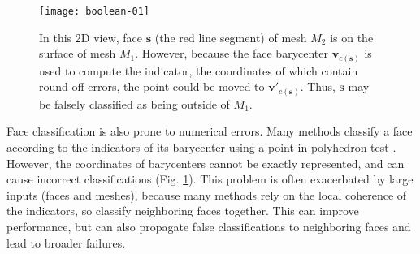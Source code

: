 
\begin{figure}[t]
\centering
\texttt{[image: boolean-01]}
\caption{In this 2D view, face $\bm{s}$ (the red line segment) of mesh $M_2$ is on the surface of mesh $M_1$. However, because the face barycenter $\bm{v}_{c(\bm{s})}$ is used to compute the indicator, the coordinates of which contain round-off errors, the point could be moved to $\bm{v'}_{c(\bm{s})}$. Thus, $\bm{s}$ may be falsely classified as being outside of $M_1$.}
\label{fig:falseclass}
\end{figure}


Face classification is also prone to numerical errors. Many methods classify a face according to the indicators of its barycenter using a point-in-polyhedron test \cite{feito2013fast,campen2010exact}. However, the coordinates of barycenters cannot be exactly represented, and can cause incorrect classifications (Fig. \ref{fig:falseclass}). This problem is often exacerbated by large inputs (faces and meshes), because many methods \cite{pavic2010hybrid,feito2013fast,ogayar2015deferred,zhou2016mesh} rely on the local coherence of the indicators, so classify neighboring faces together. This can improve performance, but can also propagate false classifications to neighboring faces and lead to broader failures.


